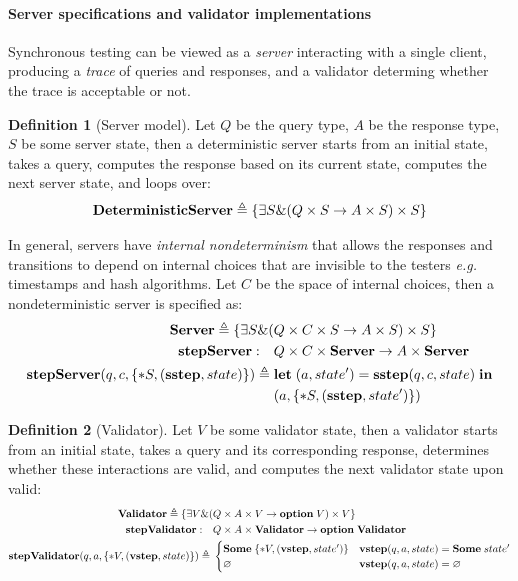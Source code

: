 \documentclass{article}
\theoremstyle{definition}
\newtheorem{definition}{Definition}
\newcommand{\Let}{\ottkw{let}\;}
\newcommand{\In}{\;\ottkw{in}}
\newcommand{\letin}[2]{\Let#1=#2\In}
\newcommand{\sigT}[2]{\{\exists#1\&#2\}}
\newcommand{\existT}[2]{\{*#1,#2\}}
\newcommand{\Server}{\ottkw{Server}}
\newcommand{\Validator}{\ottkw{Validator}}
\newcommand{\stepServer}{\ottkw{stepServer}}
\newcommand{\stepValidator}{\ottkw{stepValidator}}
\newcommand{\sstep}{\ottkw{sstep}}
\newcommand{\vstep}{\ottkw{vstep}}
\newcommand{\option}{\ottkw{option}\;}
\newcommand{\Some}[1]{\ottkw{Some}\;#1}
\newcommand{\None}{\varnothing}
\begin{document}
\paragraph{Server specifications and validator implementations}
Synchronous testing can be viewed as a {\em server} interacting with a single
client, producing a {\em trace} of queries and responses, and a validator
determing whether the trace is acceptable or not.

\begin{definition}[Server model]
Let $Q$ be the query type, $A$ be the response type, $S$ be some server state,
then a deterministic server starts from an initial state, takes a query,
computes the response based on its current state, computes the next server
state, and loops over:
\[ \ottkw{DeterministicServer}\triangleq\sigT{S}{(Q \times S \to A \times S) \times S} \]

In general, servers have {\em internal nondeterminism} that allows the responses
and transitions to depend on internal choices that are invisible to the testers
{\it e.g.} timestamps and hash algorithms.  Let $C$ be the space of internal
choices, then a nondeterministic server is specified as:
\begin{align*}
  \Server\triangleq\sigT{S}{(&Q \times C \times S \to A \times S) \times S} \\
  \stepServer :\quad&Q\times C \times \Server \to A\times \Server \\
  \stepServer(q,c,\existT{S}{(\sstep, state)})\triangleq\;&\letin{(a,state')}{\sstep(q,c,state)} \\
  &(a, \existT{S}{(\sstep, state')})
\end{align*}
\end{definition}

\begin{definition}[Validator]
Let $V$ be some validator state, then a validator starts from an initial state,
takes a query and its corresponding response, determines whether these
interactions are valid, and computes the next validator state upon valid:
\begin{align*}
  \Validator\triangleq\sigT{V}{(&Q \times A \times V \to \option V) \times V} \\
  \stepValidator:\quad&Q\times A \times \Validator \to \option \Validator \\
  \stepValidator(q,a,\existT{V}{(\vstep, state)})\triangleq\;&\begin{cases}
  \Some{\existT{V}{(\vstep,state')}} & \vstep(q,a,state)=\Some{state'} \\
  \None & \vstep(q,a,state)=\None
  \end{cases}
\end{align*}
\end{definition}
\end{document}

